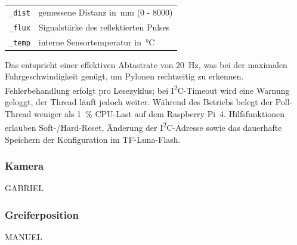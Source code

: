 \documentclass[main.tex]{subfiles} %
\begin{document}
\begin{center}
  \begin{tabular}{@{}ll@{}}
    \texttt{\_dist} & gemessene Distanz in~\si{mm} (0 - 8000)\\
    \texttt{\_flux} & Signalstärke des reflektierten Pulses\\
    \texttt{\_temp} & interne Sensortemperatur in~\si{\celsius}
  \end{tabular}
\end{center}

Das entspricht einer effektiven Abtastrate von \SI{20}{Hz}, was bei der
maximalen Fahrgeschwindigkeit genügt, um Pylonen rechtzeitig zu erkennen.
Fehlerbehandlung erfolgt pro Lesezyklus; bei I\textsuperscript{2}C-Timeout
wird eine Warnung geloggt, der Thread läuft jedoch weiter.
Während des Betriebs belegt der Poll-Thread weniger als
\SI{1}{\percent} CPU-Last auf dem Raspberry Pi~4.
Hilfsfunktionen erlauben Soft-/Hard-Reset, Änderung der
I\textsuperscript{2}C-Adresse
sowie das dauerhafte Speichern der Konfiguration im TF-Luna-Flash.

\subsubsection*{Kamera}

GABRIEL

\subsubsection*{Greiferposition}

MANUEL
\end{document}
